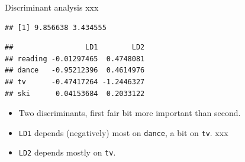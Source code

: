 \documentclass[ignorenonframetext,]{beamer}
\newenvironment{Shaded}{\begin{snugshade}}{\end{snugshade}}
\newcommand{\DataTypeTok}[1]{\textcolor[rgb]{0.13,0.29,0.53}{#1}}
\newcommand{\FloatTok}[1]{\textcolor[rgb]{0.00,0.00,0.81}{#1}}
\newcommand{\KeywordTok}[1]{\textcolor[rgb]{0.13,0.29,0.53}{\textbf{#1}}}
\newcommand{\NormalTok}[1]{#1}
\newcommand{\OperatorTok}[1]{\textcolor[rgb]{0.81,0.36,0.00}{\textbf{#1}}}
\newcommand{\StringTok}[1]{\textcolor[rgb]{0.31,0.60,0.02}{#1}}
\begin{document}
\begin{frame}[fragile]{Discriminant analysis xxx}
\protect\hypertarget{discriminant-analysis-xxx}{}

\small

\begin{Shaded}
\end{Shaded}

\begin{verbatim}
## [1] 9.856638 3.434555
\end{verbatim}

\begin{Shaded}
\end{Shaded}

\begin{verbatim}
##                 LD1        LD2
## reading -0.01297465  0.4748081
## dance   -0.95212396  0.4614976
## tv      -0.47417264 -1.2446327
## ski      0.04153684  0.2033122
\end{verbatim}

\normalsize

\begin{itemize}
\item
  Two discriminants, first fair bit more important than second.
\item
  \texttt{LD1} depends (negatively) most on \texttt{dance}, a bit on
  \texttt{tv}. xxx
\item
  \texttt{LD2} depends mostly on \texttt{tv}.
\end{itemize}

\end{frame}
\end{document}
